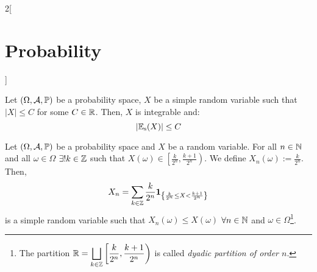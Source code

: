 \documentclass[../../../main_math.tex]{subfiles}
\begin{document}
\begin{multicols}{2}[\section{Probability}]
\begin{proposition}
  \end{proposition}
  \begin{proposition}
    Let $(\Omega,\mathcal{A},\mathbb{P})$ be a probability space, $X$ be a simple random variable such that $|X|\leq C$ for some $C\in\mathbb{R}$. Then, $X$ is integrable and: $$\abs{\mathbb{E}_\text{s}(X)}\leq C$$
  \end{proposition}
  \begin{proposition}
    Let $(\Omega,\mathcal{A},\mathbb{P})$ be a probability space and $X$ be a random variable. For all $n\in\mathbb{N}$ and all $\omega\in\Omega$ $\exists! k\in\mathbb{Z}$ such that $X(\omega)\in\left[\frac{k}{2^n},\frac{k+1}{2^n}\right)$. We define $X_n(\omega):=\frac{k}{2^n}$. Then, $$X_n=\sum_{k\in\mathbb{Z}}\frac{k}{2^n}\boldsymbol{\mathrm{1}}_{\left\{\frac{k}{2^n}\leq X< \frac{k+1}{2^n}\right\}}$$ is a simple random variable such that $X_n(\omega)\leq X(\omega)$ $\forall n\in\mathbb{N}$ and $\omega\in \Omega$\footnote{The partition $\displaystyle\mathbb{R}=\bigsqcup_{k\in\mathbb{Z}}\left[\frac{k}{2^n},\frac{k+1}{2^n}\right)$ is called \emph{dyadic partition of order $n$}.}.
  \end{proposition}

\end{multicols}
\end{document}
